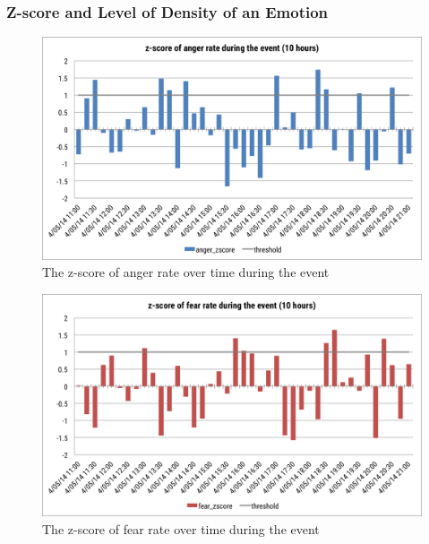 \subsubsection{Z-score and Level of Density of an Emotion}
\begin{figure}[htb!] 
\centering    
\includegraphics[width=1.0\textwidth]{AngerZscoreEvent}
\caption{The z-score of anger rate over time during the event}
\label{fig:angerZscoreEvent}
\end{figure}

\begin{figure}[htb!] 
\centering    
\includegraphics[width=1.0\textwidth]{FearZscoreEvent}
\caption{The z-score of fear rate over time during the event}
\label{fig:fearZscoreEvent}
\end{figure}

